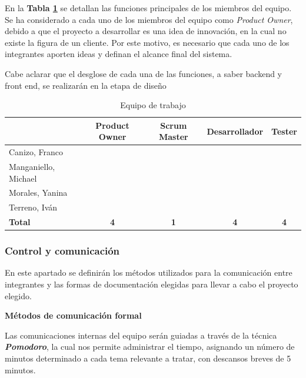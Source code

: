 En la \textbf{Tabla \ref{equipoDeTrabajo}} se detallan las funciones principales de los miembros del equipo.
Se ha considerado a cada uno de los miembros del equipo como \textit{Product Owner}, debido a que el proyecto a desarrollar es una idea de innovación, en la cual no existe la figura de un cliente.
Por este motivo, es necesario que cada uno de los integrantes aporten ideas y definan el alcance final del sistema.

Cabe aclarar que el desglose de cada una de las funciones, a saber backend y front end, se realizarán en la etapa de diseño


\begin{table}[h]
\begin{center}
\begin{tabular}{|l|c|c|c|c|}
	\hline                      & Product Owner & Scrum Master & Desarrollador & Tester     \\
	\hline Canizo, Franco       & \checkmark    &              & \checkmark    & \checkmark \\
	\hline Manganiello, Michael & \checkmark    & \checkmark   & \checkmark    & \checkmark \\
	\hline Morales, Yanina      & \checkmark    &              & \checkmark    & \checkmark \\
	\hline Terreno, Iván        & \checkmark    &              & \checkmark    & \checkmark \\
	\hline \textbf{Total}       & \textbf{4}    & \textbf{1}   & \textbf{4}    & \textbf{4} \\
\hline
\end{tabular}
\caption{Equipo de trabajo}
\label{equipoDeTrabajo}
\end{center}
\end{table}


\subsubsection{Control y comunicación}
En este apartado se definirán los métodos utilizados para la comunicación entre integrantes y las formas de documentación elegidas para llevar a cabo el proyecto elegido.


\textbf{Métodos de comunicación formal}

Las comunicaciones internas del equipo serán guiadas a través de la técnica \textbf{\textit{Pomodoro}}, la cual nos permite administrar el tiempo, asignando un número de minutos determinado a cada tema relevante a tratar, con descansos breves de 5 minutos.

